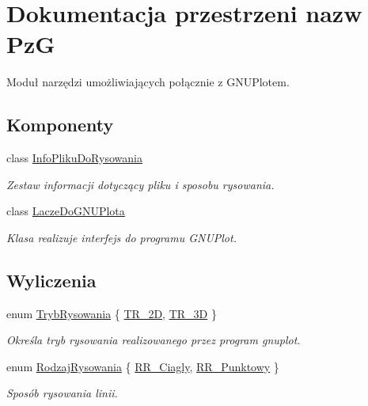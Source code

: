 \hypertarget{namespace_pz_g}{}\section{Dokumentacja przestrzeni nazw PzG}
\label{namespace_pz_g}


Moduł narzędzi umożliwiających połącznie z G\+N\+U\+Plotem.  


\subsection*{Komponenty}
\begin{DoxyCompactItemize}
\item 
class \mbox{\hyperlink{class_pz_g_1_1_info_pliku_do_rysowania}{Info\+Pliku\+Do\+Rysowania}}
\begin{DoxyCompactList}\small\item\em Zestaw informacji dotyczący pliku i sposobu rysowania. \end{DoxyCompactList}\item 
class \mbox{\hyperlink{class_pz_g_1_1_lacze_do_g_n_u_plota}{Lacze\+Do\+G\+N\+U\+Plota}}
\begin{DoxyCompactList}\small\item\em Klasa realizuje interfejs do programu G\+N\+U\+Plot. \end{DoxyCompactList}\end{DoxyCompactItemize}
\subsection*{Wyliczenia}
\begin{DoxyCompactItemize}
\item 
enum \mbox{\hyperlink{namespace_pz_g_aeedae1ef10c66d720f9e89de408ca4ca}{Tryb\+Rysowania}} \{ \mbox{\hyperlink{namespace_pz_g_aeedae1ef10c66d720f9e89de408ca4caa5eb0cf8b3405e136f092efdb489d60c4}{T\+R\+\_\+2D}}, 
\mbox{\hyperlink{namespace_pz_g_aeedae1ef10c66d720f9e89de408ca4caa856e6b0fa6b8a9dc184c60cf27dcc5d2}{T\+R\+\_\+3D}}
 \}
\begin{DoxyCompactList}\small\item\em Określa tryb rysowania realizowanego przez program {\ttfamily gnuplot}. \end{DoxyCompactList}\item 
enum \mbox{\hyperlink{namespace_pz_g_a705c92106f39b7d0c34a6739d10ff0b6}{Rodzaj\+Rysowania}} \{ \mbox{\hyperlink{namespace_pz_g_a705c92106f39b7d0c34a6739d10ff0b6a927eaa159aa4bd3198f0a330b967746d}{R\+R\+\_\+\+Ciagly}}, 
\mbox{\hyperlink{namespace_pz_g_a705c92106f39b7d0c34a6739d10ff0b6aa01097ee8266d6402b752ef6f9a4690c}{R\+R\+\_\+\+Punktowy}}
 \}
\begin{DoxyCompactList}\small\item\em Sposób rysowania linii. \end{DoxyCompactList}\end{DoxyCompactItemize}
